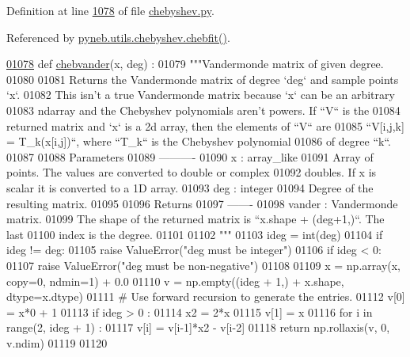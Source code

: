 Definition at line \hyperlink{chebyshev_8py_source_l01078}{1078} of file \hyperlink{chebyshev_8py_source}{chebyshev.\+py}.



Referenced by \hyperlink{chebyshev_8py_source_l01121}{pyneb.\+utils.\+chebyshev.\+chebfit()}.


\begin{DoxyCode}
\hypertarget{namespacepyneb_1_1utils_1_1chebyshev_l01078}{}\hyperlink{namespacepyneb_1_1utils_1_1chebyshev_aa9deae857486c8ee69362ded985b09d8}{01078} \textcolor{keyword}{def }\hyperlink{namespacepyneb_1_1utils_1_1chebyshev_aa9deae857486c8ee69362ded985b09d8}{chebvander}(x, deg) :
01079     \textcolor{stringliteral}{"""Vandermonde matrix of given degree.}
01080 \textcolor{stringliteral}{}
01081 \textcolor{stringliteral}{    Returns the Vandermonde matrix of degree `deg` and sample points `x`.}
01082 \textcolor{stringliteral}{    This isn't a true Vandermonde matrix because `x` can be an arbitrary}
01083 \textcolor{stringliteral}{    ndarray and the Chebyshev polynomials aren't powers. If ``V`` is the}
01084 \textcolor{stringliteral}{    returned matrix and `x` is a 2d array, then the elements of ``V`` are}
01085 \textcolor{stringliteral}{    ``V[i,j,k] = T\_k(x[i,j])``, where ``T\_k`` is the Chebyshev polynomial}
01086 \textcolor{stringliteral}{    of degree ``k``.}
01087 \textcolor{stringliteral}{}
01088 \textcolor{stringliteral}{    Parameters}
01089 \textcolor{stringliteral}{    ----------}
01090 \textcolor{stringliteral}{    x : array\_like}
01091 \textcolor{stringliteral}{        Array of points. The values are converted to double or complex}
01092 \textcolor{stringliteral}{        doubles. If x is scalar it is converted to a 1D array.}
01093 \textcolor{stringliteral}{    deg : integer}
01094 \textcolor{stringliteral}{        Degree of the resulting matrix.}
01095 \textcolor{stringliteral}{}
01096 \textcolor{stringliteral}{    Returns}
01097 \textcolor{stringliteral}{    -------}
01098 \textcolor{stringliteral}{    vander : Vandermonde matrix.}
01099 \textcolor{stringliteral}{        The shape of the returned matrix is ``x.shape + (deg+1,)``. The last}
01100 \textcolor{stringliteral}{        index is the degree.}
01101 \textcolor{stringliteral}{}
01102 \textcolor{stringliteral}{    """}
01103     ideg = int(deg)
01104     \textcolor{keywordflow}{if} ideg != deg:
01105         \textcolor{keywordflow}{raise} ValueError(\textcolor{stringliteral}{"deg must be integer"})
01106     \textcolor{keywordflow}{if} ideg < 0:
01107         \textcolor{keywordflow}{raise} ValueError(\textcolor{stringliteral}{"deg must be non-negative"})
01108 
01109     x = np.array(x, copy=0, ndmin=1) + 0.0
01110     v = np.empty((ideg + 1,) + x.shape, dtype=x.dtype)
01111     \textcolor{comment}{# Use forward recursion to generate the entries.}
01112     v[0] = x*0 + 1
01113     \textcolor{keywordflow}{if} ideg > 0 :
01114         x2 = 2*x
01115         v[1] = x
01116         \textcolor{keywordflow}{for} i \textcolor{keywordflow}{in} range(2, ideg + 1) :
01117             v[i] = v[i-1]*x2 - v[i-2]
01118     \textcolor{keywordflow}{return} np.rollaxis(v, 0, v.ndim)
01119 
01120 
\end{DoxyCode}

